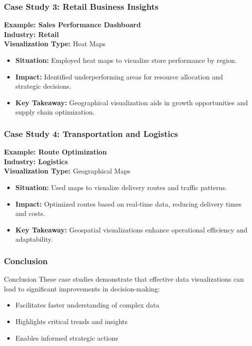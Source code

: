 \documentclass[aspectratio=169]{beamer}
\begin{document}
\begin{frame}[fragile]
    \frametitle{Case Study 3: Retail Business Insights}
    \textbf{Example: Sales Performance Dashboard} \\
    \textbf{Industry: Retail} \\
    \textbf{Visualization Type:} Heat Maps
    \begin{itemize}
        \item \textbf{Situation:} Employed heat maps to visualize store performance by region.
        \item \textbf{Impact:} Identified underperforming areas for resource allocation and strategic decisions.
        \item \textbf{Key Takeaway:} Geographical visualization aids in growth opportunities and supply chain optimization.
    \end{itemize}
\end{frame}

\begin{frame}[fragile]
    \frametitle{Case Study 4: Transportation and Logistics}
    \textbf{Example: Route Optimization} \\
    \textbf{Industry: Logistics} \\
    \textbf{Visualization Type:} Geographical Maps
    \begin{itemize}
        \item \textbf{Situation:} Used maps to visualize delivery routes and traffic patterns.
        \item \textbf{Impact:} Optimized routes based on real-time data, reducing delivery times and costs.
        \item \textbf{Key Takeaway:} Geospatial visualizations enhance operational efficiency and adaptability.
    \end{itemize}
\end{frame}

\begin{frame}[fragile]
    \frametitle{Conclusion}
    \begin{block}{Conclusion}
        These case studies demonstrate that effective data visualizations can lead to significant improvements in decision-making:
    \end{block}
    \begin{itemize}
        \item Facilitates faster understanding of complex data
        \item Highlights critical trends and insights
        \item Enables informed strategic actions
    \end{itemize}
\end{frame}
\end{document}
